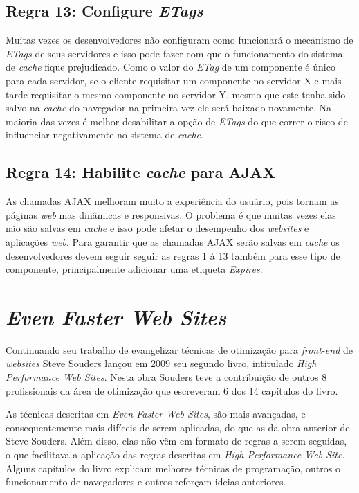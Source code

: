 \subsection{Regra 13: Configure \textit{ETags}}
\label{subsec:highperformance_regra13}
Muitas vezes os desenvolvedores não configuram como funcionará o mecanismo de \textit{ETags} de seus servidores e isso pode fazer com que o funcionamento do sistema de \textit{cache} fique prejudicado. Como o valor do \textit{ETag} de um componente é único para cada servidor, se o cliente requisitar um componente no servidor X e mais tarde requisitar o mesmo componente no servidor Y, mesmo que este tenha sido salvo na \textit{cache} do navegador na primeira vez ele será baixado novamente. Na maioria das vezes é melhor desabilitar a opção de \textit{ETags} do que correr o risco de influenciar negativamente no sistema de \textit{cache}.

\subsection{Regra 14: Habilite \textit{cache} para AJAX}
\label{subsec:highperformance_regra14}
As chamadas AJAX melhoram muito a experiência do usuário, pois tornam as páginas \textit{web} mas dinâmicas e responsivas. O problema é que muitas vezes elas não são salvas em \textit{cache} e isso pode afetar o desempenho dos \textit{websites} e aplicações \textit{web}. Para garantir que as chamadas AJAX serão salvas em \textit{cache} os desenvolvedores devem seguir seguir as regras 1 à 13 também para esse tipo de componente, principalmente adicionar uma etiqueta \textit{Expires}.

\section{\textit{Even Faster Web Sites}}
\label{sec:evenfasterwebsites}

Continuando seu trabalho de evangelizar técnicas de otimização para \textit{front-end} de \textit{websites} Steve Souders lançou em 2009 seu segundo livro, intitulado \textit{High Performance Web Sites}. Nesta obra Souders teve a contribuição de outros 8 profissionais da área de otimização que escreveram 6 dos 14 capítulos do livro.

As técnicas descritas em \textit{Even Faster Web Sites}, são mais avançadas, e consequentemente mais difíceis de serem aplicadas, do que as da obra anterior de Steve Souders. Além disso, elas não vêm em formato de regras a serem seguidas, o que facilitava a aplicação das regras descritas em \textit{High Performance Web Site}. Alguns capítulos do livro explicam melhores técnicas de programação, outros o funcionamento de navegadores e outros reforçam ideias anteriores.

